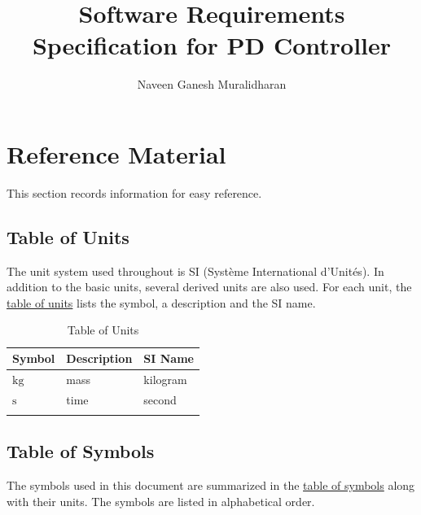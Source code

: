 \documentclass[12pt]{article}
\title{Software Requirements Specification for PD Controller}
\author{Naveen Ganesh Muralidharan}
\begin{document}
\maketitle
\tableofcontents
\newpage
\section{Reference Material}
\label{Sec:RefMat}
This section records information for easy reference.

\subsection{Table of Units}
\label{Sec:ToU}
The unit system used throughout is SI (Système International d'Unités). In addition to the basic units, several derived units are also used. For each unit, the \hyperref[Table:ToU]{table of units} lists the symbol, a description and the SI name.

\begin{longtable}{l l l}
\toprule
\textbf{Symbol} & \textbf{Description} & \textbf{SI Name}
\\
\midrule
\endhead
${\text{kg}}$ & mass & kilogram
\\
${\text{s}}$ & time & second
\\
\bottomrule
\caption{Table of Units}
\label{Table:ToU}
\end{longtable}
\subsection{Table of Symbols}
\label{Sec:ToS}
The symbols used in this document are summarized in the \hyperref[Table:ToS]{table of symbols} along with their units. The symbols are listed in alphabetical order.
\end{document}
